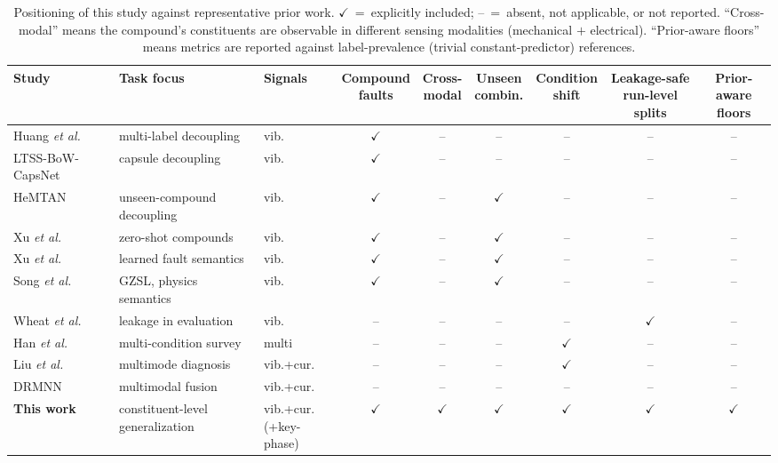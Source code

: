 \begin{table}[!t]
\caption{Positioning of this study against representative prior work.
$\checkmark$~=~explicitly included; --~=~absent, not applicable, or not
reported. ``Cross-modal'' means the compound's constituents are observable in
different sensing modalities (mechanical $+$ electrical). ``Prior-aware
floors'' means metrics are reported against label-prevalence (trivial
constant-predictor) references.}
\label{tab:positioning}
\centering
\footnotesize
\setlength{\tabcolsep}{4.5pt}
\begin{tabular}{l l l c c c c c c}
\hline
Study & Task focus & Signals & \makecell{Compound\\faults} &
\makecell{Cross-\\modal} & \makecell{Unseen\\combin.} &
\makecell{Condition\\shift} & \makecell{Leakage-safe\\run-level splits} &
\makecell{Prior-aware\\floors} \\
\hline
Huang \emph{et al.} \cite{huang2019ddcnn} & multi-label decoupling & vib. & $\checkmark$ & -- & -- & -- & -- & -- \\
LTSS-BoW-CapsNet \cite{ltssbow2024} & capsule decoupling & vib. & $\checkmark$ & -- & -- & -- & -- & -- \\
HeMTAN \cite{hemtan2024} & unseen-compound decoupling & vib. & $\checkmark$ & -- & $\checkmark$ & -- & -- & -- \\
Xu \emph{et al.} \cite{eswa2022} & zero-shot compounds & vib. & $\checkmark$ & -- & $\checkmark$ & -- & -- & -- \\
Xu \emph{et al.} \cite{eswa2023} & learned fault semantics & vib. & $\checkmark$ & -- & $\checkmark$ & -- & -- & -- \\
Song \emph{et al.} \cite{song2025gzsl} & GZSL, physics semantics & vib. & $\checkmark$ & -- & $\checkmark$ & -- & -- & -- \\
Wheat \emph{et al.} \cite{wheat2024} & leakage in evaluation & vib. & -- & -- & -- & -- & $\checkmark$ & -- \\
Han \emph{et al.} \cite{han2025} & multi-condition survey & multi & -- & -- & -- & $\checkmark$ & -- & -- \\
Liu \emph{et al.} \cite{liu2024tii} & multimode diagnosis & vib.+cur. & -- & -- & -- & $\checkmark$ & -- & -- \\
DRMNN \cite{drmnn2020} & multimodal fusion & vib.+cur. & -- & -- & -- & -- & -- & -- \\
\textbf{This work} & \makecell[l]{constituent-level\\generalization} &
\makecell[l]{vib.+cur.\\(+key-phase)} & $\checkmark$ & $\checkmark$ &
$\checkmark$ & $\checkmark$ & $\checkmark$ & $\checkmark$ \\
\hline
\end{tabular}
\end{table}

